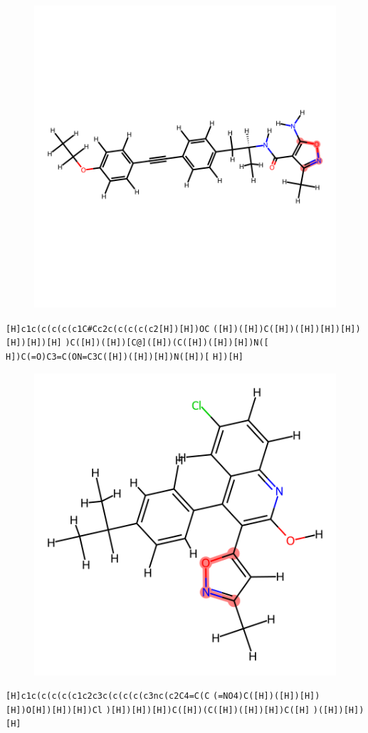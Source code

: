 \documentclass{article}
\begin{document}
\begin{figure}[ht]
\centering
    \includegraphics{mol60.png}
\end{figure}
\verb|[H]c1c(c(c(c(c1C#Cc2c(c(c(c(c2[H])[H])OC| \verb|([H])([H])C([H])([H])[H])[H])[H])[H])[H]| \verb|)C([H])([H])[C@]([H])(C([H])([H])[H])N([| \verb|H])C(=O)C3=C(ON=C3C([H])([H])[H])N([H])[| \verb|H])[H]|

\begin{figure}[ht]
\centering
    \includegraphics{mol61.png}
\end{figure}
\verb|[H]c1c(c(c(c(c1c2c3c(c(c(c(c3nc(c2C4=C(C| \verb|(=NO4)C([H])([H])[H])[H])O[H])[H])[H])Cl| \verb|)[H])[H])[H])C([H])(C([H])([H])[H])C([H]| \verb|)([H])[H])[H]|
\end{document}
